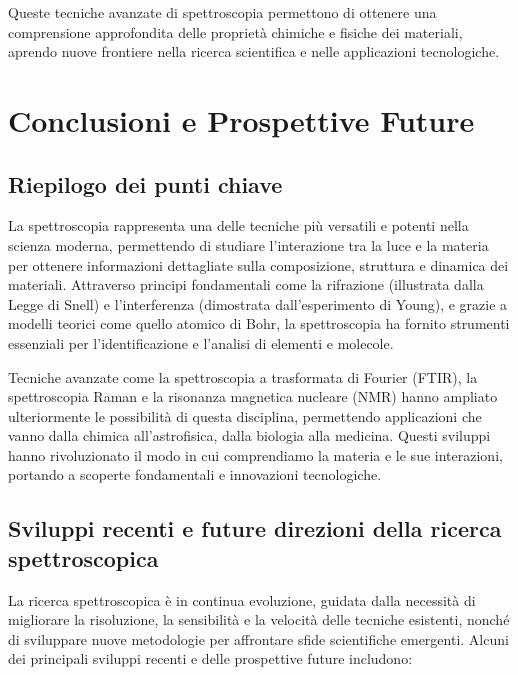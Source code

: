 \documentclass[12pt,a4paper]{report}
\begin{document}
Queste tecniche avanzate di spettroscopia permettono di ottenere una comprensione approfondita delle proprietà chimiche e fisiche dei materiali, aprendo nuove frontiere nella ricerca scientifica e nelle applicazioni tecnologiche.

\section{Conclusioni e Prospettive Future}

\subsection{Riepilogo dei punti chiave}

La spettroscopia rappresenta una delle tecniche più versatili e potenti nella scienza moderna, permettendo di studiare l'interazione tra la luce e la materia per ottenere informazioni dettagliate sulla composizione, struttura e dinamica dei materiali. Attraverso principi fondamentali come la rifrazione (illustrata dalla Legge di Snell) e l'interferenza (dimostrata dall'esperimento di Young), e grazie a modelli teorici come quello atomico di Bohr, la spettroscopia ha fornito strumenti essenziali per l'identificazione e l'analisi di elementi e molecole.

Tecniche avanzate come la spettroscopia a trasformata di Fourier (FTIR), la spettroscopia Raman e la risonanza magnetica nucleare (NMR) hanno ampliato ulteriormente le possibilità di questa disciplina, permettendo applicazioni che vanno dalla chimica all'astrofisica, dalla biologia alla medicina. Questi sviluppi hanno rivoluzionato il modo in cui comprendiamo la materia e le sue interazioni, portando a scoperte fondamentali e innovazioni tecnologiche.

\subsection{Sviluppi recenti e future direzioni della ricerca spettroscopica}

La ricerca spettroscopica è in continua evoluzione, guidata dalla necessità di migliorare la risoluzione, la sensibilità e la velocità delle tecniche esistenti, nonché di sviluppare nuove metodologie per affrontare sfide scientifiche emergenti. Alcuni dei principali sviluppi recenti e delle prospettive future includono:
\end{document}
